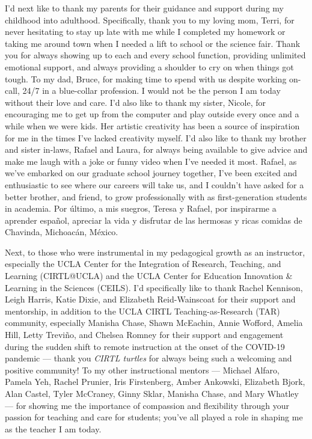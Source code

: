 {I'd next like to thank my parents for their guidance and support during my childhood into adulthood. Specifically, thank you to my loving mom, Terri, for never hesitating to stay up late with me while I completed my homework or taking me around town when I needed a lift to school or the science fair. Thank you for always showing up to each and every school function, providing unlimited emotional support, and always providing a shoulder to cry on when things got tough. To my dad, Bruce, for making time to spend with us despite working on-call, 24/7 in a blue-collar profession. I would not be the person I am today without their love and care. I'd also like to thank my sister, Nicole, for encouraging me to get up from the computer and play outside every once and a while when we were kids. Her artistic creativity has been a source of inspiration for me in the times I've lacked creativity myself. I'd also like to thank my brother and sister in-laws, Rafael and Laura, for always being available to give advice and make me laugh with a joke or funny video when I've needed it most. Rafael, as we've embarked on our graduate school journey together, I've been excited and enthusiastic to see where our careers will take us, and I couldn't have asked for a better brother, and friend, to grow professionally with as first-generation students in academia. Por último, a mis suegros, Teresa y Rafael, por inspirarme a aprender español, apreciar la vida y disfrutar de las hermosas y ricas comidas de Chavinda, Michoacán, México.

Next, to those who were instrumental in my pedagogical growth as an instructor, especially the UCLA Center for the Integration of Research, Teaching, and Learning (CIRTL@UCLA) and the UCLA Center for Education Innovation \& Learning in the Sciences (CEILS). I'd specifically like to thank Rachel Kennison, Leigh Harris, Katie Dixie, and Elizabeth Reid-Wainscoat for their support and mentorship, in addition to the UCLA CIRTL Teaching-as-Research (TAR) community, especially Manisha Chase, Shawn McEachin, Annie Wofford, Amelia Hill, Letty Treviño, and Chelsea Romney for their support and engagement during the sudden shift to remote instruction at the onset of the COVID-19 pandemic --- thank you \emph{CIRTL turtles} for always being such a welcoming and positive community! To my other instructional mentors --- Michael Alfaro, Pamela Yeh, Rachel Prunier, Iris Firstenberg, Amber Ankowski, Elizabeth Bjork, Alan Castel, Tyler McCraney, Ginny Sklar, Manisha Chase, and Mary Whatley  --- for showing me the importance of compassion and flexibility through your passion for teaching and care for students; you've all played a role in shaping me as the teacher I am today.

}
